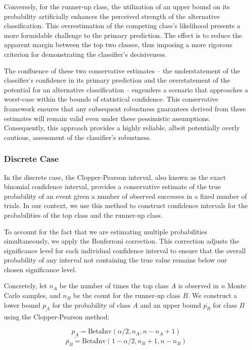 Conversely, for the runner-up class, the utilization of an upper bound on its probability artificially enhances the perceived strength of the alternative classification.
This overestimation of the competing class's likelihood presents a more formidable challenge to the primary prediction.
The effect is to reduce the apparent margin between the top two classes, thus imposing a more rigorous criterion for demonstrating the classifier's decisiveness.

The confluence of these two conservative estimates – the understatement of the classifier's confidence in its primary prediction and the overstatement of the potential for an alternative classification – engenders a scenario that approaches a worst-case within the bounds of statistical confidence.
This conservative framework ensures that any subsequent robustness guarantees derived from these estimates will remain valid even under these pessimistic assumptions.
Consequently, this approach provides a highly reliable, albeit potentially overly cautious, assessment of the classifier's robustness.

\subsubsection{Discrete Case}\label{subsubsec:discrete-case}
In the discrete case, the Clopper-Pearson interval, also known as the exact binomial confidence interval, provides a conservative estimate of the true probability of an event given a number of observed successes in a fixed number of trials.
In our context, we use this method to construct confidence intervals for the probabilities of the top class and the runner-up class.

To account for the fact that we are estimating multiple probabilities simultaneously, we apply the Bonferroni correction.
This correction adjusts the significance level for each individual confidence interval to ensure that the overall probability of any interval not containing the true value remains below our chosen significance level.

Concretely, let $n_A$ be the number of times the top class $A$ is observed in $n$ Monte Carlo samples, and $n_B$ be the count for the runner-up class $B$.
We construct a lower bound $\underline{p_A}$ for the probability of class $A$ and an upper bound $\overline{p_B}$ for class $B$ using the Clopper-Pearson method:

\begin{equation}
    \underline{p_A} = \text{BetaInv}(\alpha/2, n_A, n - n_A + 1)
\end{equation}
\begin{equation}
    \overline{p_B} = \text{BetaInv}(1-\alpha/2, n_B + 1, n - n_B)
\end{equation}

